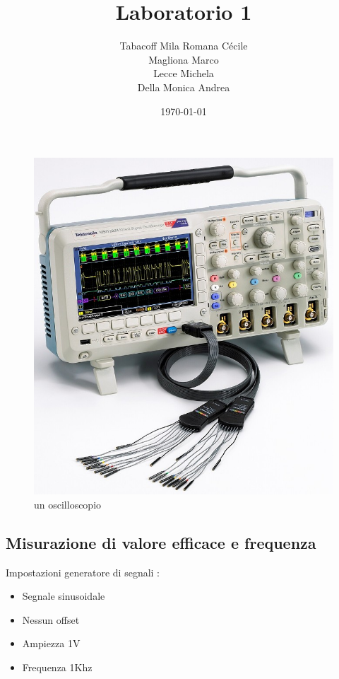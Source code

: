 \documentclass[a4paper]{article}
\begin{document}
\title{Laboratorio 1}
\author{
        Tabacoff Mila Romana Cécile \\
        Magliona Marco \\
        Lecce Michela \\
        Della Monica Andrea}

\date{\today}
\maketitle


\begin{figure}[h]
\centering
\includegraphics[scale=0.5]{dso.jpg}
\caption{un oscilloscopio}
\end{figure}


\begin{tcolorbox}[breakable,colback=cyan,colframe=cyan]
\section*{Misurazione di valore efficace e frequenza}
\end{tcolorbox}

Impostazioni generatore di segnali :
\begin{itemize}
\item Segnale sinusoidale
\item Nessun offset
\item Ampiezza 1V
\item Frequenza 1Khz
\end{itemize}
\end{document}
